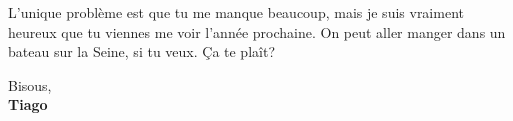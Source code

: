 \documentclass[11pt]{article}
\begin{document}

L'unique problème est que  {\color{red}tu me manque} beaucoup, mais je suis vraiment heureux que tu {\color{red}viennes} me voir l'année prochaine.
On peut aller manger dans un bateau
{\color{red}sur la Seine}, si tu veux. Ça te plaît?


Bisous,\\[2em]


%


%
{\bfseries Tiago}\\
%
\end{document}
